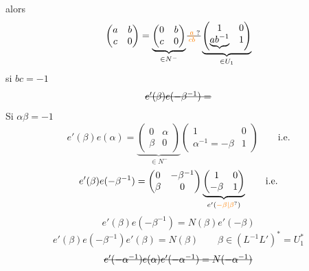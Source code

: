 alors
\[\begin{pmatrix}a&b\\c&0\end{pmatrix}=\underbrace{\begin{pmatrix}0&b\\c&0\end{pmatrix}}_{\in N^-}\deleted{\unsure{\frac{a}{cb}}}\underbrace{\begin{pmatrix}1&0\\\underbrace{ab^{-1}}&1\end{pmatrix}}_{\in U_1}\]
si $bc=-1$
\[\deleted{e'(\beta)e(-\beta^{-1})=}\]
Si $\alpha\beta=-1$
\[e'(\beta)e(\alpha)=\underbrace{\begin{pmatrix}0&\alpha\\\beta&0\end{pmatrix}}_{\in N^-}\begin{pmatrix}1&0\\\alpha^{-1}=-\beta&1\end{pmatrix}\qquad\text{i.e.}\]
\[e'(\beta)e(-\beta^{-1})=\begin{pmatrix}0&-\beta^{-1}\\\beta&0\end{pmatrix}\underbrace{\begin{pmatrix}1&0\\-\beta&1\end{pmatrix}}_{e'(\unsure{-\beta|\beta})}\qquad\text{i.e.}\]
\[e'(\beta)e(-\beta^{-1})=N(\beta)e'(-\beta)\]
\[\boxed{\boxed{e'(\beta)e(-\beta^{-1})e'(\beta)=N(\beta)}}\qquad \beta\in(L^{-1}L')^*=U_1^{*}\]
\[\deleted{e'(-\alpha^{-1})e(\alpha)e'(-\alpha^{-1})=N(-\alpha^{-1})}\]
